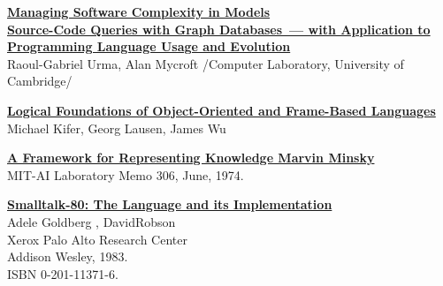 \begin{thebibliography}{99}

\href{https://insights.sei.cmu.edu/sei_blog/2015/09/managing-software-complexity-in-models.html}{\textbf{Managing
Software Complexity in Models}}\\

\href{https://www.repository.cam.ac.uk/bitstream/handle/1810/247929/Urma%20and%20Mycroft%202013%20Science%20of%20Computer%20Programming.pdf}{\textbf{Source-Code
Queries with Graph Databases\ --- with Application to Programming Language Usage and Evolution}}\\ Raoul-Gabriel Urma, Alan Mycroft
/Computer Laboratory, University of Cambridge/

\href{http://www3.cs.stonybrook.edu/~kifer/TechReports/flogic.pdf}{\textbf{Logical
Foundations of Object-Oriented and Frame-Based Languages}}\\
Michael Kifer, Georg Lausen, James Wu

\href{https://web.media.mit.edu/~minsky/papers/Frames/frames.html}{\textbf{A
Framework for Representing Knowledge Marvin Minsky}}\\
MIT-AI Laboratory Memo 306, June, 1974.

\href{http://stephane.ducasse.free.fr/FreeBooks/BlueBook/Bluebook.pdf}{\textbf{Smalltalk-80:
The Language and its Implementation}}\\
Adele Goldberg , DavidRobson\\
Xerox Palo Alto Research Center\\
Addison Wesley, 1983.\\
ISBN 0-201-11371-6.\\

\end{thebibliography}
